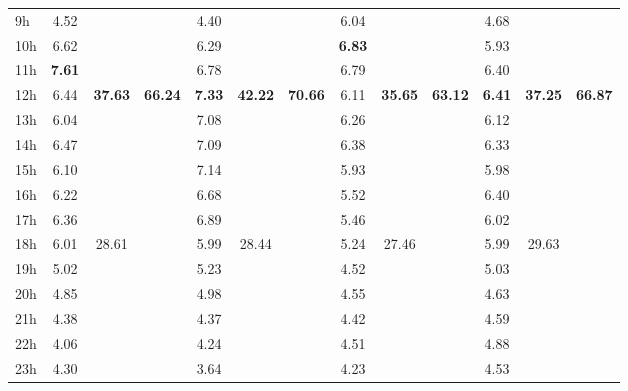 \documentclass[%
 aip,
 jmp,%
 amsmath,amssymb,
 reprint,%
]{revtex4-1}
\begin{document}
\begin{table}
\begin{center}
\begin{tabular}{ |l|| c|c|c| c|c|c| c|c|c| c|c|c|}
9h  & 4.52 &                        &                         & 4.40  & & & 6.04 & & & 4.68 & & \\
10h & 6.62 &                        &                         & 6.29  & & & {\bf 6.83} & & & 5.93 & & \\
11h & {\bf 7.61} &                        &                         & 6.78  & & & 6.79 & & & 6.40 & & \\\hline
12h & 6.44 & \multirow{6}{*}{\bf 37.63} & \multirow{12}{*}{\bf 66.24} & {\bf 7.33}  & \multirow{6}{*}{\bf 42.22} & \multirow{12}{*}{ \bf 70.66} & 6.11 & \multirow{6}{*}{\bf 35.65} &  \multirow{12}{*}{ \bf 63.12} & {\bf 6.41} & \multirow{6}{*}{\bf 37.25} &  \multirow{12}{*}{\bf 66.87} \\
13h & 6.04 &                        &                         & 7.08  & & & 6.26 & & & 6.12 & & \\
14h & 6.47 &                        &                         & 7.09  & & & 6.38 & & & 6.33 & & \\
15h & 6.10 &                        &                         & 7.14  & & & 5.93 & & & 5.98 & & \\
16h & 6.22 &                        &                         & 6.68  & & & 5.52 & & & 6.40 & & \\
17h & 6.36 &                        &                         & 6.89  & & & 5.46 & & & 6.02 & & \\\cline{3-3}\cline{6-6}\cline{9-9}\cline{12-12}


18h & 6.01 & \multirow{6}{*}{28.61} &                         & 5.99  & \multirow{6}{*}{28.44} & & 5.24 & \multirow{6}{*}{27.46} & & 5.99 & \multirow{6}{*}{29.63} & \\
19h & 5.02 &                        &                         & 5.23  & & & 4.52 & & & 5.03 & & \\
20h & 4.85 &                        &                         & 4.98  & & & 4.55 & & & 4.63 & & \\
21h & 4.38 &                        &                         & 4.37  & & & 4.42 & & & 4.59 & & \\
22h & 4.06 &                        &                         & 4.24  & & & 4.51 & & & 4.88 & & \\
23h & 4.30 &                        &                         & 3.64  & & & 4.23 & & & 4.53 & & \\\hline
    \end{tabular}
\end{center}
\label{dia}
\end{table}
\end{document}
